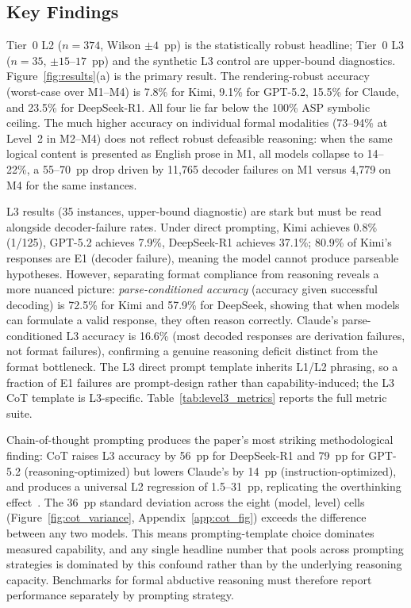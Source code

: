 \documentclass{article}
\theoremstyle{definition}
\begin{document}
\subsection{Key Findings}\label{subsec:findings}

Tier~0 L2 ($n=374$, Wilson $\pm 4$~pp) is the statistically robust headline; Tier~0 L3 ($n=35$, $\pm 15$--$17$~pp) and the synthetic L3 control are upper-bound diagnostics. Figure~\ref{fig:results}(a) is the primary result. The rendering-robust accuracy (worst-case over M1--M4) is 7.8\% for Kimi, 9.1\% for GPT-5.2, 15.5\% for Claude, and 23.5\% for DeepSeek-R1. All four lie far below the 100\% ASP symbolic ceiling. The much higher accuracy on individual formal modalities (73--94\% at Level~2 in M2--M4) does not reflect robust defeasible reasoning: when the same logical content is presented as English prose in M1, all models collapse to 14--22\%, a 55--70~pp drop driven by 11{,}765 decoder failures on M1 versus 4{,}779 on M4 for the same instances.

L3 results (35 instances, upper-bound diagnostic) are stark but must be read alongside decoder-failure rates. Under direct prompting, Kimi achieves 0.8\% (1/125), GPT-5.2 achieves 7.9\%, DeepSeek-R1 achieves 37.1\%; 80.9\% of Kimi's responses are E1 (decoder failure), meaning the model cannot produce parseable hypotheses. However, separating format compliance from reasoning reveals a more nuanced picture: \emph{parse-conditioned accuracy} (accuracy given successful decoding) is 72.5\% for Kimi and 57.9\% for DeepSeek, showing that when models can formulate a valid response, they often reason correctly. Claude's parse-conditioned L3 accuracy is 16.6\% (most decoded responses are derivation failures, not format failures), confirming a genuine reasoning deficit distinct from the format bottleneck. The L3 direct prompt template inherits L1/L2 phrasing, so a fraction of E1 failures are prompt-design rather than capability-induced; the L3 CoT template is L3-specific. Table~\ref{tab:level3_metrics} reports the full metric suite.

Chain-of-thought prompting produces the paper's most striking methodological finding: CoT raises L3 accuracy by 56~pp for DeepSeek-R1 and 79~pp for GPT-5.2 (reasoning-optimized) but lowers Claude's by 14~pp (instruction-optimized), and produces a universal L2 regression of 1.5--31~pp, replicating the overthinking effect~\citep{chen2024overthinking}. The 36~pp standard deviation across the eight (model, level) cells (Figure~\ref{fig:cot_variance}, Appendix~\ref{app:cot_fig}) exceeds the difference between any two models. This means prompting-template choice dominates measured capability, and any single headline number that pools across prompting strategies is dominated by this confound rather than by the underlying reasoning capacity. Benchmarks for formal abductive reasoning must therefore report performance separately by prompting strategy.
\end{document}
